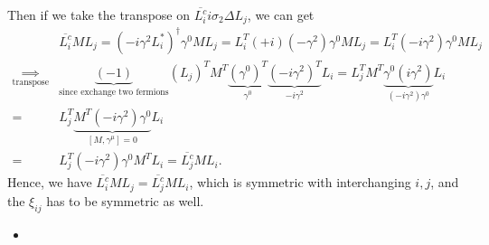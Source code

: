 Then if we take the transpose on $\overline{L_i^c} i\sigma_2 \Delta L_j$, we can get
\begin{align}
    &\overline{L_i^c} M L_j= (-i\gamma^2 L_i^*)^\dagger\gamma^0 M L_j=L_i^T (+i)(-\gamma^2)\gamma^0 M L_j=L_i^T (-i\gamma^2)\gamma^0 M L_j\\
    \underset{\text{transpose}}{\implies}& \underbrace{(-1)}_{\text{since exchange two fermions}} (L_j)^T M^T \underbrace{(\gamma^0)^T}_{\gamma^0} \underbrace{(-i\gamma^2)^T}_{-i\gamma^2} L_i = L_j^T M^T \underbrace{\gamma^0 (i\gamma^2)}_{(-i\gamma^2)\gamma^0} L_i \\
    =& L_j^T \underbrace{M^T  (-i\gamma^2)\gamma^0}_{[M,\gamma^\mu]=0} L_i\\
    =&L_j^T (-i\gamma^2)\gamma^0 M^T   L_i =  \overline{L_j^c} M L_i.
\end{align} 
Hence, we have $\overline{L_i^c} M L_j= \overline{L_j^c} M L_i$, which is symmetric with interchanging $i,j$, and the $\xi_{ij}$ has to be symmetric as well.

\begin{itemize}
    \item [(b)]
\end{itemize}

